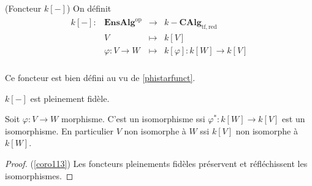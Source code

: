             \begin{defi} (Foncteur $k[-]$)
                On définit
                \begin{align*}
                    \begin{array}{cccc}
                        k[-] : & \mathbf{EnsAlg}^\mathrm{op} & \to & k-\mathbf{CAlg}_\mathrm{tf, red} \\
                        & V & \mapsto & k[V] \\
                        & \varphi : V \to W & \mapsto & k[\varphi] : k[W] \to k[V] \\
                    \end{array}
                \end{align*}
            \end{defi}
            Ce foncteur est bien défini au vu de \ref{phistarfunct}.
            \begin{theo}
                \label{theo115}
                $k[-]$ est pleinement fidèle.
            \end{theo}
            \begin{coro}
                \label{coro113}
                Soit $\varphi : V \to W$ morphisme. C'est un isomorphisme ssi $\varphi^* : k[W] \to k[V]$ est un isomorphisme. En particulier $V$ non isomorphe à $W$ ssi $k[V]$ non isomorphe à $k[W]$.
            \end{coro}
            \begin{proof} (\ref{coro113})
                Les foncteurs pleinements fidèles préservent et réfléchissent les isomorphismes.
            \end{proof}
